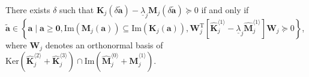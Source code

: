 \documentclass[10pt,a4paper]{amsart}
\begin{document}
\begin{proposition}\label{prop:scaling}
	There exists $\delta$ such that $\mathbf{K}_j(\delta \tilde{\mathbf{a}}) - \underline{\lambda}_j \mathbf{M}_j(\delta \tilde{\mathbf{a}}) \succeq 0$ if and only if $\tilde{\mathbf{a}} \in \left\{\mathbf{a} \;\vert\; \mathbf{a}\ge \mathbf{0}, \mathrm{Im}\left(\mathbf{M}_j(\mathbf{a})\right) \subseteq \mathrm{Im}\left(\mathbf{K}_j(\mathbf{a})\right),\mathbf{W}_j^\mathrm{T}\left[\hat{\mathbf{K}}_{j}^{\langle 1\rangle} - \underline{\lambda}_j \hat{\mathbf{M}}_{j}^{\langle 1\rangle} \right]\mathbf{W}_j \succeq 0\right\}$, where $\mathbf{W}_j$ denotes an orthonormal basis of $\mathrm{Ker}\left(\hat{\mathbf{K}}_j^{\langle 2\rangle} + \hat{\mathbf{K}}_j^{\langle 3\rangle}\right) \cap \mathrm{Im}\left(\hat{\mathbf{M}}_j^{\langle 0\rangle} + \hat{\mathbf{M}}_j^{\langle 1\rangle}\right)$.
\end{proposition}
\end{document}
